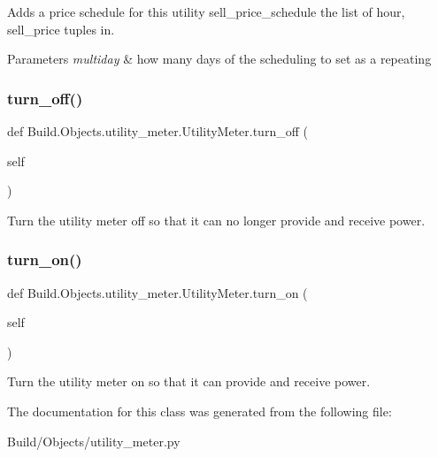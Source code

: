 Adds a price schedule for this utility  sell\+\_\+price\+\_\+schedule the list of hour, sell\+\_\+price tuples in. 


\begin{DoxyParams}{Parameters}
{\em multiday} & how many days of the scheduling to set as a repeating \\
\hline
\end{DoxyParams}
\mbox{\label{class_build_1_1_objects_1_1utility__meter_1_1_utility_meter_a33fc2489dff8710a37e6067238f30305}} 
\subsubsection{\texorpdfstring{turn\+\_\+off()}{turn\_off()}}
{\footnotesize\ttfamily def Build.\+Objects.\+utility\+\_\+meter.\+Utility\+Meter.\+turn\+\_\+off (\begin{DoxyParamCaption}\item[{}]{self }\end{DoxyParamCaption})}



Turn the utility meter off so that it can no longer provide and receive power. 

\mbox{\label{class_build_1_1_objects_1_1utility__meter_1_1_utility_meter_a426b005fc2ad0ce41094d80e324a251f}} 
\subsubsection{\texorpdfstring{turn\+\_\+on()}{turn\_on()}}
{\footnotesize\ttfamily def Build.\+Objects.\+utility\+\_\+meter.\+Utility\+Meter.\+turn\+\_\+on (\begin{DoxyParamCaption}\item[{}]{self }\end{DoxyParamCaption})}



Turn the utility meter on so that it can provide and receive power. 



The documentation for this class was generated from the following file\+:\begin{DoxyCompactItemize}
\item 
Build/\+Objects/utility\+\_\+meter.\+py\end{DoxyCompactItemize}
